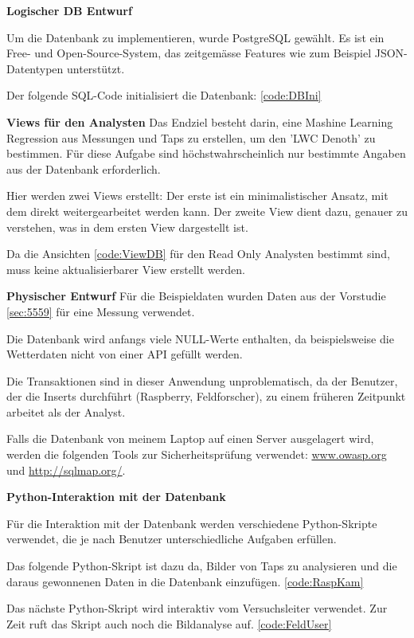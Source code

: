 \textbf{Logischer DB Entwurf}


Um die Datenbank zu implementieren, wurde PostgreSQL gewählt. Es ist ein Free- und Open-Source-System, das zeitgemässe Features wie zum Beispiel JSON-Datentypen unterstützt.

Der folgende SQL-Code initialisiert die Datenbank: \ref{code:DBIni}

\textbf{Views für den Analysten}
Das Endziel besteht darin, eine Mashine Learning Regression aus Messungen und Taps zu erstellen, um den 'LWC Denoth' zu bestimmen. Für diese Aufgabe sind höchstwahrscheinlich nur bestimmte Angaben aus der Datenbank erforderlich.

Hier werden zwei Views erstellt: Der erste ist ein minimalistischer Ansatz, mit dem direkt weitergearbeitet werden kann. Der zweite View dient dazu, genauer zu verstehen, was in dem ersten View dargestellt ist.

Da die Ansichten \ref{code:ViewDB} für den Read Only Analysten bestimmt sind, muss keine aktualisierbarer View erstellt werden.



\textbf{Physischer Entwurf}
Für die Beispieldaten wurden Daten aus der Vorstudie \ref{sec:5559} für eine Messung verwendet.

Die Datenbank wird anfangs viele NULL-Werte enthalten, da beispielsweise die Wetterdaten nicht von einer API gefüllt werden.

Die Transaktionen sind in dieser Anwendung unproblematisch, da der Benutzer, der die Inserts durchführt (Raspberry, Feldforscher), zu einem früheren Zeitpunkt arbeitet als der Analyst.

Falls die Datenbank von meinem Laptop auf einen Server ausgelagert wird, werden die folgenden Tools zur Sicherheitsprüfung verwendet: \href{https://www.owasp.org}{www.owasp.org} und \href{http://sqlmap.org/}{http://sqlmap.org/}.

\textbf{Python-Interaktion mit der Datenbank}

Für die Interaktion mit der Datenbank werden verschiedene Python-Skripte verwendet, die je nach Benutzer unterschiedliche Aufgaben erfüllen.

Das folgende Python-Skript ist dazu da, Bilder von Taps zu analysieren und die daraus gewonnenen Daten in die Datenbank einzufügen. \ref{code:RaspKam}

Das nächste Python-Skript wird interaktiv vom Versuchsleiter verwendet. Zur Zeit ruft das Skript auch noch die Bildanalyse auf. \ref{code:FeldUser}


